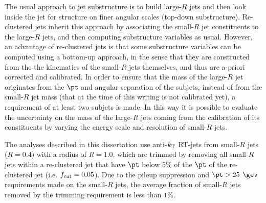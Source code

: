 The usual approach to jet substructure is to build large-$R$ jets and then look inside the jet for structure on finer angular scales (top-down substructure). Re-clustered jets inherit this approach by associating the small-$R$ jet constituents to the large-$R$ jets, and then computing substructure variables as usual. However, an advantage of re-clustered jets is that some substructure variables can be computed using a bottom-up approach, in the sense that they are constructed from the the kinematics of the small-$R$ jets themselves, and thus are a-priori corrected and calibrated.  In order to ensure that the mass of the large-$R$ jet originates from the $\pt$ and angular separation of the subjets, instead of from the small-$R$ jet mass (that at the time of this writing is not calibrated yet), a requirement of at least two subjets is made.  In this way it is possible to evaluate the uncertainty on the mass of the large-$R$ jets coming from the calibration of its constituents by varying the energy scale and resolution of small-$R$ jets.

The analyses described in this dissertation use anti-$k_{\rm T}$ RT-jets from small-$R$ jets ($R=0.4$) with a radius of $R=1.0$, which are trimmed  by removing all small-$R$ jets within a re-clustered jet that have $\pt$ below $5\%$ of the $\pt$ of the re-clustered jet (i.e. $f_{\rm cut}=0.05$).  Due to the pileup suppression and $\pt>25$ $\gev$ requirements made on the small-$R$ jets, the average fraction of small-$R$ jets removed by the trimming requirement is less than $1\%$.  



